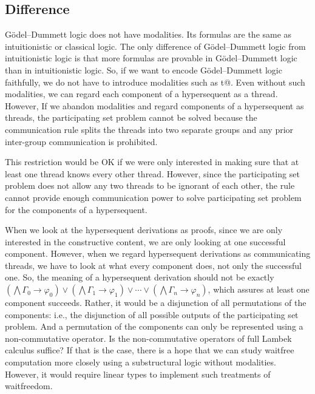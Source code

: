 \subsection{Difference}

G\"odel--Dummett logic does not have modalities.  Its formulas are the
same as intuitionistic or classical logic.  The only difference of
G\"odel--Dummett logic from intuitionistic logic is that more formulas
are provable in G\"odel--Dummett
logic than in intuitionistic logic.  So, if we want to encode G\"odel--Dummett
logic faithfully, we do not have to introduce modalities such as \verb@K t@.
Even without such modalities, we can regard each component of a
hypersequent as a thread. However,
If we abandon modalities and regard components of a hypersequent as
threads, the participating set problem cannot be solved because the communication rule
splits the threads into two separate groups and any prior
inter-group communication is prohibited.

This restriction would be OK if we were only interested in making sure that
at least one thread knows every other thread.  However, since the
participating set problem does not allow any two threads to be ignorant
of each other, the \verb@comm@ rule cannot provide enough communication power
to solve participating set problem for the components of a hypersequent.

When we look at the hypersequent derivations as proofs, since we are only
interested in the constructive content, we are only looking at one
successful component.  However, when we regard hypersequent derivations as
communicating threads, we have to look at what every component does, not
only the successful one.  So, the meaning of a hypersequent derivation
should not be exactly
$\left(\bigwedge\Gamma_0\rightarrow\varphi_0\right)\vee\left(\bigwedge\Gamma_1\rightarrow\varphi_1\right)\vee\cdots\vee\left(\bigwedge
\Gamma_n\rightarrow\varphi_n\right)$, which assures at least one component
succeeds.
Rather, it would be a disjunction of all permutations of the components:
i.e., the disjunction of all possible outputs of the participating set problem.
And a permutation of the components can only be represented using a
non-commutative operator.  Is the non-commutative operators of
full Lambek calculus suffice?  If that is the case, there is a hope that
we can study
waitfree computation more closely using a substructural logic without
modalities.
However, it would require linear types to implement such treatments of
waitfreedom.

